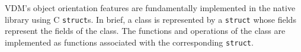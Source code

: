 %
VDM's object orientation features are fundamentally implemented in the native library using C \texttt{struct}s.
%
In brief, a class is represented by a \texttt{struct} whose fields represent the fields of the class.
%
The functions and operations of the class are implemented as functions associated with the corresponding \texttt{struct}.

